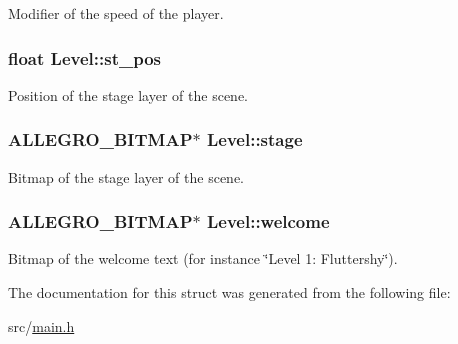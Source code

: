 \-Modifier of the speed of the player. \hypertarget{structLevel_ab13f799d9e2e06a04debbd97676fb512}{
\subsubsection[{st\-\_\-pos}]{\setlength{\rightskip}{0pt plus 5cm}float {\bf \-Level\-::st\-\_\-pos}}}\label{structLevel_ab13f799d9e2e06a04debbd97676fb512}
\-Position of the stage layer of the scene. \hypertarget{structLevel_ad412b858a4e688114dd89a44ecb005bb}{
\subsubsection[{stage}]{\setlength{\rightskip}{0pt plus 5cm}\-A\-L\-L\-E\-G\-R\-O\-\_\-\-B\-I\-T\-M\-A\-P$\ast$ {\bf \-Level\-::stage}}}\label{structLevel_ad412b858a4e688114dd89a44ecb005bb}
\-Bitmap of the stage layer of the scene. \hypertarget{structLevel_a575fec7686bd94b5c35b15d73296c977}{
\subsubsection[{welcome}]{\setlength{\rightskip}{0pt plus 5cm}\-A\-L\-L\-E\-G\-R\-O\-\_\-\-B\-I\-T\-M\-A\-P$\ast$ {\bf \-Level\-::welcome}}}\label{structLevel_a575fec7686bd94b5c35b15d73296c977}
\-Bitmap of the welcome text (for instance \char`\"{}\-Level 1\-: Fluttershy\char`\"{}). 

\-The documentation for this struct was generated from the following file\-:\begin{DoxyCompactItemize}
\item 
src/\hyperlink{main_8h}{main.\-h}\end{DoxyCompactItemize}
